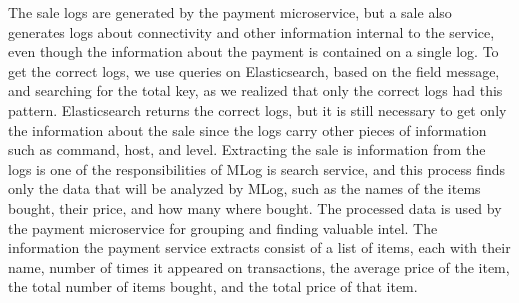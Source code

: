 The sale logs are generated by the payment microservice, but a sale also generates logs about connectivity and other information internal to the service, even though the information about the payment is contained on a single log. To get the correct logs, we use queries on Elasticsearch, based on the field message, and searching for the total key, as we realized that only the correct logs had this pattern.
Elasticsearch returns the correct logs, but it is still necessary to get only the information about the sale since the logs carry other pieces of information such as command,  host, and level. Extracting the sale is information from the logs is one of the responsibilities of MLog is search service, and this process finds only the data that will be analyzed by MLog, such as the names of the items bought, their price, and how many where bought.
The processed data is used by the payment microservice for grouping and finding valuable intel. The information the payment service extracts consist of a list of items, each with their name, number of times it appeared on transactions, the average price of the item, the total number of items bought, and the total price of that item.